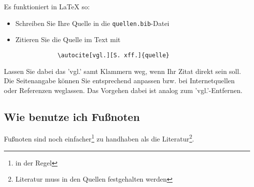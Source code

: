     Es funktioniert in \LaTeX{} so:
    \begin{itemize}
        \item Schreiben Sie Ihre Quelle in die \texttt{quellen.bib}-Datei
        \item Zitieren Sie die Quelle im Text mit \begin{verbatim}
            \autocite[vgl.][S. xff.]{quelle}
        \end{verbatim}
       
    \end{itemize} 
    Lassen Sie dabei das 'vgl.' samt Klammern weg, wenn Ihr Zitat direkt sein soll.
    Die Seitenangabe können Sie entsprechend anpassen bzw. bei Internetquellen oder Referenzen weglassen. Das Vorgehen dabei ist analog zum 'vgl.'-Entfernen.

    \subsection{Wie benutze ich Fußnoten}
    Fußnoten sind noch einfacher\footnote{in der Regel} zu handhaben als die Literatur\footnote{Literatur muss in den Quellen festgehalten werden}.